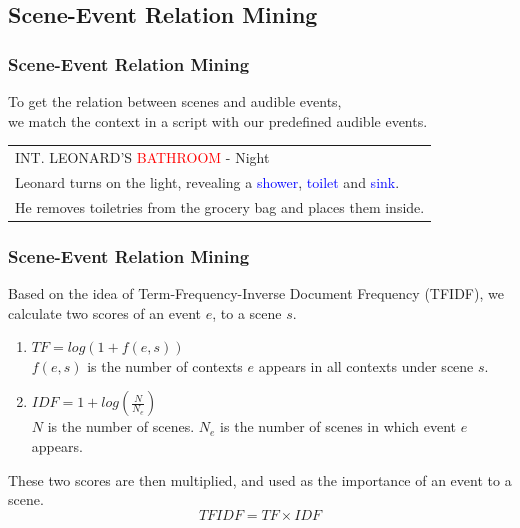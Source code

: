 \documentclass[xcolor=table,slidestop,compress,mathserif]{beamer}
\begin{document}
\subsection{Scene-Event Relation Mining}
\begin{frame}
	\frametitle{Scene-Event Relation Mining}
	To get the relation between scenes and audible events, \\ 
	we match the context in a script with our predefined audible events. \\ 
	\begin{table}[h]
		\begin{tabular}{|l|}
		\hline
		INT. LEONARD'S \textcolor{red}{BATHROOM} - Night \\ 
		Leonard turns on the light, revealing a \textcolor{blue}{shower}, \textcolor{blue}{toilet} and \textcolor{blue}{sink}.\\
		He removes toiletries from the grocery bag and places them inside. \\ 
		\hline
		\end{tabular}
	\end{table}
\end{frame}
\begin{frame}
	\frametitle{Scene-Event Relation Mining}
	Based on the idea of Term-Frequency-Inverse Document Frequency (TFIDF), we calculate two scores of an event $e$, to a scene $s$. 
	\begin{enumerate}
		\item{$TF=log(1+f(e,s))$}\\
		$f(e,s)$ is the number of contexts $e$ appears in all contexts under scene $s$. 
		\item{$IDF=1+log(\frac{N}{N_e})$} \\ 
		$N$ is the number of scenes. 
		$N_e$ is the number of scenes in which event $e$ appears. 
	\end{enumerate}
	These two scores are then multiplied, and used as the importance of an event to a scene. 		
	\begin{equation}
		TFIDF = TF \times IDF 
	\end{equation}	
\end{frame}
\end{document}
